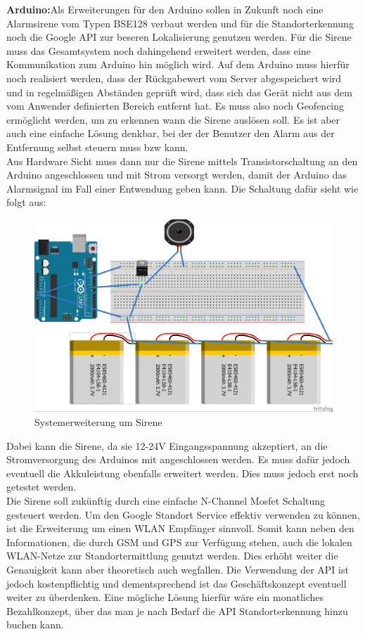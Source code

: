 \textbf{Arduino:}Als Erweiterungen für den Arduino sollen in Zukunft noch eine Alarmsirene vom Typen BSE128 verbaut werden und für die Standorterkennung noch die Google API zur beseren Lokalisierung genutzen werden. 
Für die Sirene muss das Gesamtsystem noch dahingehend erweitert werden, dass eine Kommunikation zum Arduino hin möglich wird. Auf dem Arduino muss hierfür noch realisiert werden, dass der Rückgabewert vom Server abgespeichert wird und in regelmäßigen Abständen geprüft wird, dass sich das Gerät nicht aus dem vom Anwender definierten Bereich entfernt hat. Es muss also noch Geofencing ermöglicht werden, um zu erkennen wann die Sirene auslösen soll. Es ist aber auch eine einfache Lösung denkbar, bei der der Benutzer den Alarm aus der Entfernung selbst steuern muss bzw kann.
\\
Aus Hardware Sicht muss dann nur die Sirene mittels Transistorschaltung an den Arduino angeschlossen und mit Strom versorgt werden, damit der Arduino das Alarmsignal im Fall einer Entwendung geben kann. Die Schaltung dafür sieht wie folgt aus:
\begin{figure} [H]
	\begin{center}
		\includegraphics[width=1\textwidth]{Bilder/Arduino_Sirene.jpg}
		\caption{Systemerweiterung um Sirene}
		\label{sirene}
	\end{center}
\end{figure}
Dabei kann die Sirene, da sie 12-24V Eingangsspannung akzeptiert, an die Stromversorgung des Arduinos mit angeschlossen werden. Es muss dafür jedoch eventuell die Akkuleistung ebenfalls erweitert werden. Dies muss jedoch erst noch getestet werden. 
\\
Die Sirene soll zukünftig durch eine einfache N-Channel Mosfet Schaltung gesteuert werden.
Um den Google Standort Service effektiv verwenden zu können, ist die Erweiterung um einen WLAN Empfänger sinnvoll. Somit kann neben den Informationen, die durch GSM und GPS zur Verfügung stehen, auch die lokalen WLAN-Netze zur Standortermittlung genutzt werden. Dies erhöht weiter die Genauigkeit kann aber theoretisch auch wegfallen. Die Verwendung der API ist jedoch kostenpflichtig und dementsprechend ist das Geschäftskonzept eventuell weiter zu überdenken. Eine mögliche Lösung hierfür wäre ein monatliches Bezahlkonzept, über das man je nach Bedarf die API Standorterkennung hinzu buchen kann.




